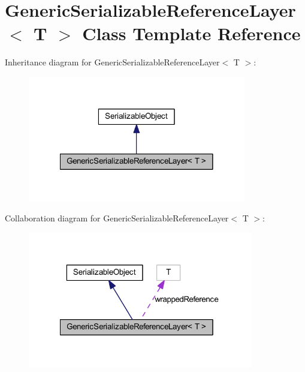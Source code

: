 \hypertarget{class_generic_serializable_reference_layer}{
\section{GenericSerializableReferenceLayer$<$ T $>$ Class Template Reference}
\label{class_generic_serializable_reference_layer}
}


Inheritance diagram for GenericSerializableReferenceLayer$<$ T $>$:\nopagebreak
\begin{figure}[H]
\begin{center}
\leavevmode
\includegraphics[width=270pt]{class_generic_serializable_reference_layer__inherit__graph}
\end{center}
\end{figure}


Collaboration diagram for GenericSerializableReferenceLayer$<$ T $>$:\nopagebreak
\begin{figure}[H]
\begin{center}
\leavevmode
\includegraphics[width=278pt]{class_generic_serializable_reference_layer__coll__graph}
\end{center}
\end{figure}

